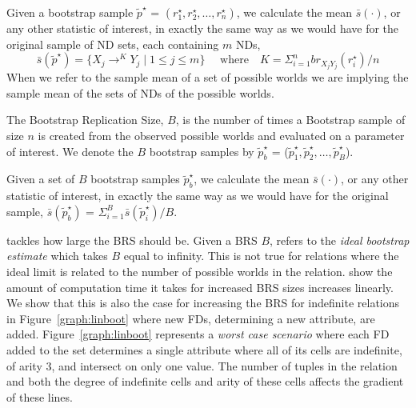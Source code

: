 \begin{definition}
\begin{rm}
Given a bootstrap sample {\bf $\tilde{p}^\star$} = \linebreak[4] $(r_1^\star, r_2^\star, \ldots, r_n^\star )$, we calculate the
mean $\bar{s}(\cdot)$, or any other statistic of interest, in exactly the same
way as we would have for the original sample of ND sets, each containing $m$ NDs, 
\[\bar{s}(\tilde{p}^\star) = \{ X_j \to^K Y_j \mid 1 \le j \le m \}\quad\mbox{ where}\quad K = {\Sigma_{i = 1}^n br_{X_jY_j}(r_i^\star)/n}\]
When we refer to the sample mean of a set of possible worlds we are implying
the sample mean of the sets of NDs of the possible worlds.
\end{rm}
\end{definition}



\begin{definition}
\begin{rm}
The Bootstrap Replication Size, $B$, is the number of times a Bootstrap
sample of size $n$ is created from the observed possible worlds and evaluated on a parameter of interest. We denote the $B$ bootstrap samples by $\tilde{p}^\star_b$ = ({\bf $\tilde{p}^\star_1, \tilde{p}^\star_2, \ldots, \tilde{p}^\star_B$}).
\end{rm}
\end{definition}


\begin{definition}
\begin{rm}
Given a set of $B$ bootstrap samples $\tilde{p}^\star_b$,  
we calculate the mean $\bar{s}(\cdot)$, or any other statistic of 
interest, in exactly the same
way as we would have for the original sample, 
$\bar{s}(\tilde{p}^\star_b)$  = $\Sigma_{i = 1}^B \bar{s}(\tilde{p}^\star_i) / B$.
\end{rm}
\end{definition}


\cite{et93} tackles how large the BRS should be. Given a BRS $B$, \cite{et93}
refers to the {\em ideal bootstrap estimate} which takes $B$ equal to
infinity. 
This is not true for relations where the ideal limit is related to the
number of possible worlds in the relation.
\cite{et93} show the amount of computation time it takes for increased
BRS sizes increases linearly. We show that this is also the case for 
increasing the BRS for indefinite relations in Figure~\ref{graph:linboot}
where new FDs, determining a new attribute, are added.
Figure~\ref{graph:linboot} represents a {\em worst case scenario} where each FD added to the
set determines a single attribute where all of its cells are indefinite, of
arity 3, and intersect on only one value. The number of tuples in the
relation and both the degree of indefinite cells and arity of these
cells affects the gradient of these lines.


